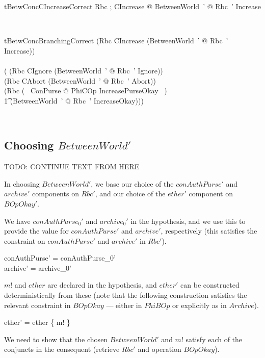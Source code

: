 \begin{LNewThm}
\begin{theorem}{tBetwConcCIncreaseCorrect}
    \forall Rbc ; CIncrease @ \exists BetweenWorld~' @ Rbc~' \land Increase %
\end{theorem}~\end{LNewThm}



\begin{LNewThm}
\begin{theorem}{tBetwConcBranchingCorrect}
    (Rbc \land CIncrease \implies (\exists BetweenWorld~' @ Rbc~' \land Increase))\\ %
    \iff \\
    (
     (Rbc \land CIgnore \implies (\exists BetweenWorld~' @ Rbc~' \land Ignore)) \land \\ %
     (Rbc \land CAbort \implies (\exists BetweenWorld~' @ Rbc~' \land Abort)) \land \\ %
     (Rbc \land (~ \exists \Delta ConPurse @ PhiCOp \land IncreasePurseOkay ~) \\ %
        \t1 \implies (\exists BetweenWorld~' @ Rbc~' \land IncreaseOkay)))  %
\end{theorem}~\end{LNewThm}

\subsection{Choosing $BetweenWorld'$}\label{ch28.bc-choice}

TODO: CONTINUE TEXT FROM HERE

In choosing $BetweenWorld'$, we base our choice of the
$conAuthPurse'$ and $archive'$ components on $Rbc'$, and our choice
of the $ether'$ component on $BOpOkay'$.

We have $conAuthPurse_0'$ and $archive_0'$ in the hypothesis, and we
use this to provide the value for $conAuthPurse'$ and $archive'$,
respectively (this satisfies the constraint on $conAuthPurse'$ and
$archive'$ in $Rbc'$).
\begin{gzed}
  conAuthPurse' = conAuthPurse_0'
  \\ %
  archive' = archive_0'
\end{gzed}
$m!$ and $ether$ are declared in the hypothesis, and $ether'$ can be
constructed deterministically from these (note that the following
construction satisfies the relevant constraint in $BOpOkay$ ---
either in $PhiBOp$ or explicitly as in $Archive$).
\begin{gzed}
  ether' = ether \cup \{ m! \}
\end{gzed}
We need to show that the chosen $BetweenWorld'$ and $m!$ satisfy
each of the conjuncts in the consequent (retrieve $Rbc'$ and
operation $BOpOkay$).

